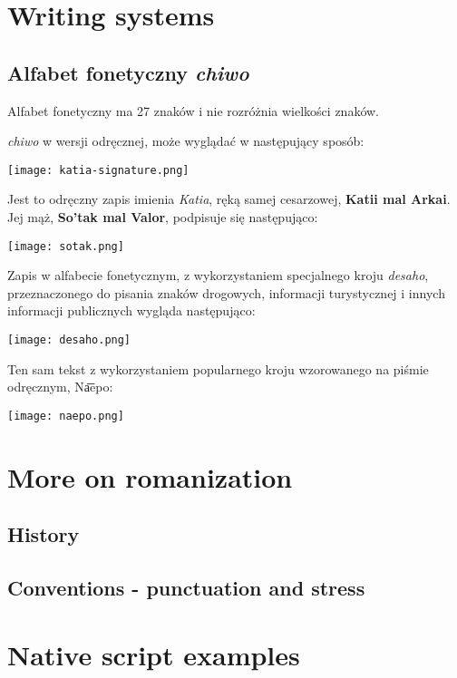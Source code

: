 \section{Writing systems}

\subsection{Alfabet fonetyczny \emph{chiwo}}

Alfabet fonetyczny ma 27 znaków i nie rozróżnia wielkości znaków.

\emph{chiwo} w wersji odręcznej, może wyglądać w następujący sposób:

\begin{center}
    \texttt{[image: katia-signature.png]}    
\end{center}

Jest to odręczny zapis imienia \emph{Katia}, ręką samej cesarzowej,
\textbf{Katii mal Arkai}. Jej mąż, \textbf{So'tak mal Valor}, podpisuje się 
następująco:

\begin{center}
    \texttt{[image: sotak.png]}
\end{center}

Zapis w alfabecie fonetycznym, z wykorzystaniem specjalnego kroju \emph{desaho},
przeznaczonego do pisania znaków drogowych, informacji turystycznej i innych
informacji publicznych wygląda następująco:

\begin{center}
    \texttt{[image: desaho.png]}
\end{center}

\skipline

Ten sam tekst z wykorzystaniem popularnego kroju wzorowanego na piśmie
odręcznym, Na͞epo:

\begin{center}
    \texttt{[image: naepo.png]}
\end{center}

\section{More on romanization}
\subsection{History}
\subsection{Conventions - punctuation and stress}

\section{Native script examples}